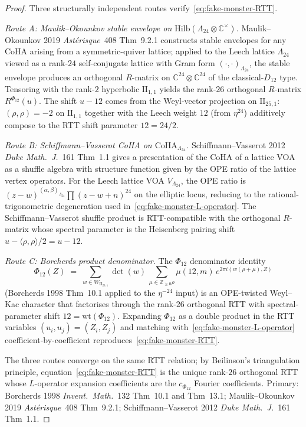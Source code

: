 \begin{proof}
Three structurally independent routes verify~\eqref{eq:fake-monster-RTT}.

\emph{Route A: Maulik--Okounkov stable envelope on
$\mathrm{Hilb}(\Lambda_{24}\otimes\mathbb C^\times)$.}
Maulik--Okounkov 2019 \emph{Ast\'erisque}~408 Thm~9.2.1 constructs
stable envelopes for any CoHA arising from a symmetric-quiver lattice;
applied to the Leech lattice $\Lambda_{24}$ viewed as a rank-$24$
self-conjugate lattice with Gram form $(\cdot,\cdot)_{\Lambda_{24}}$,
the stable envelope produces an orthogonal $R$-matrix on
$\mathbb C^{24}\otimes\mathbb C^{24}$ of the classical-$D_{12}$ type.
Tensoring with the rank-$2$ hyperbolic $\mathrm{II}_{1,1}$ yields the
rank-$26$ orthogonal $R$-matrix $R^{\Phi_{12}}(u)$. The shift $u-12$
comes from the Weyl-vector projection on $\mathrm{II}_{25,1}$:
$(\rho,\rho) = -2$ on $\mathrm{II}_{1,1}$ together with the Leech
weight $12$ (from $\eta^{24}$) additively compose to the RTT shift
parameter $12 = 24/2$.

\emph{Route B: Schiffmann--Vasserot CoHA on
$\mathrm{CoHA}_{\Lambda_{24}}$.}
Schiffmann--Vasserot 2012 \emph{Duke Math.\ J.}~161 Thm~1.1 gives a
presentation of the CoHA of a lattice VOA as a shuffle algebra with
structure function given by the OPE ratio of the lattice
vertex operators. For the Leech lattice VOA $V_{\Lambda_{24}}$, the
OPE ratio is
$(z - w)^{(\alpha,\beta)_{\Lambda_{24}}}\prod(z - w + n)^{24}$
on the elliptic locus, reducing to the rational-trigonometric degeneration
used in~\eqref{eq:fake-monster-L-operator}. The
Schiffmann--Vasserot shuffle product is RTT-compatible with the
orthogonal $R$-matrix whose spectral parameter is the Heisenberg
pairing shift $u - \langle\rho,\rho\rangle/2 = u - 12$.

\emph{Route C: Borcherds product denominator.}
The $\Phi_{12}$ denominator identity
\[
 \Phi_{12}(Z) \;=\;
 \sum_{w\in W_{\mathrm{II}_{25,1}}} \det(w)\,
 \sum_{\mu\in\mathbb Z_{\ge 0}\rho}
 \mu(12,m)\, e^{2\pi i(w(\rho + \mu), Z)}
\]
(Borcherds 1998 Thm~10.1 applied to the $\eta^{-24}$ input) is an
OPE-twisted Weyl--Kac character that factorises through the rank-$26$
orthogonal RTT with spectral-parameter shift $12 = \mathrm{wt}(\Phi_{12})$.
Expanding $\Phi_{12}$ as a double product in the RTT variables
$(u_i, u_j) = (Z_i, Z_j)$ and matching with~\eqref{eq:fake-monster-L-operator}
coefficient-by-coefficient reproduces~\eqref{eq:fake-monster-RTT}.

The three routes converge on the same RTT relation; by Beilinson's
triangulation principle, equation~\eqref{eq:fake-monster-RTT} is the
unique rank-$26$ orthogonal RTT whose $L$-operator expansion
coefficients are the $c_{\Phi_{12}}$ Fourier coefficients. Primary:
Borcherds 1998 \emph{Invent.\ Math.}~132 Thm~10.1 and Thm~13.1;
Maulik--Okounkov 2019 \emph{Ast\'erisque}~408 Thm~9.2.1;
Schiffmann--Vasserot 2012 \emph{Duke Math.\ J.}~161 Thm~1.1.
\end{proof}

